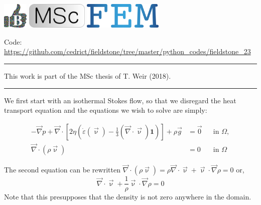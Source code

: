 \noindent
\includegraphics[height=1.25cm]{images/pictograms/benchmark}
\includegraphics[height=1.25cm]{images/pictograms/msc}
\includegraphics[height=1.25cm]{images/pictograms/FEM}


%

\begin{center}
\inpython
{\small Code: \url{https://github.com/cedrict/fieldstone/tree/master/python_codes/fieldstone_23}}
\end{center}

\par\noindent\rule{\textwidth}{0.4pt}

This work is part of the MSc thesis of T. Weir (2018).

\par\noindent\rule{\textwidth}{0.4pt}

We first start with an isothermal Stokes flow, so that we disregard the heat transport equation and 
the equations we wish to solve are simply:

\begin{align}
-\vec\nabla p +\vec\nabla \cdot \left[2 \eta \left(\dot\varepsilon(\vec \upnu)
            - \frac{1}{3}(\vec\nabla \cdot \vec\upnu) \mathbf 1\right)  \right] +   \rho \vec{g} &=\vec{0}
  &
  & \textrm{in $\Omega$},
  \\
  \vec\nabla \cdot (\rho \vec\upnu) &= 0
  &
  & \textrm{in $\Omega$}
\end{align}



The second equation can be rewritten 
$\vec\nabla \cdot (\rho \vec{\upnu}) =  \rho \vec\nabla \cdot \vec{\upnu} 
+ \vec{\upnu} \cdot \vec{\nabla}\rho=0$
or, 
\[
\vec\nabla \cdot \vec{\upnu} + \frac{1}{\rho} \vec{\upnu} \cdot {\vec\nabla}\rho = 0
\]
Note that this presupposes that the density is not zero anywhere in the domain.

